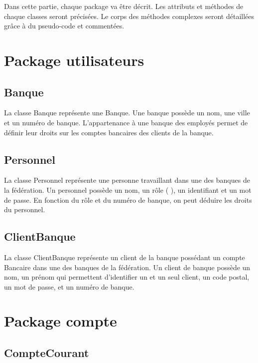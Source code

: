 Dans cette partie, chaque package va être décrit. Les attributs et méthodes de chaque classes seront précisées. Le corps des méthodes complexes seront  détaillées grâce à du pseudo-code et commentées.

\section{Package utilisateurs}

\subsection{Banque}

La classe Banque représente une Banque. Une banque possède un nom, une ville et un numéro de banque.
 L'appartenance à une banque des employés permet de définir leur droits sur les comptes bancaires des clients de
 la banque.

\subsection{Personnel}

La classe Personnel représente une personne travaillant dans une des banques de la fédération.
Un personnel possède un nom, un rôle (\color{orange}{Employe, Gerant ou} \color{green}{Admin}),
un identifiant et un mot de passe.
En fonction du rôle et du numéro de banque, on peut déduire les droits du personnel.

\subsection{ClientBanque}

La classe ClientBanque représente un client de la banque possédant un compte Bancaire dans une des banques
de la fédération. Un client de banque possède un nom, un prénom qui permettent d'identifier un et un seul client,
un code postal, un mot de passe, \color{green}{une adresse email} \color{red}{et un numéro de compte} et un numéro de banque.

\section{Package compte}

\subsection{CompteCourant}

